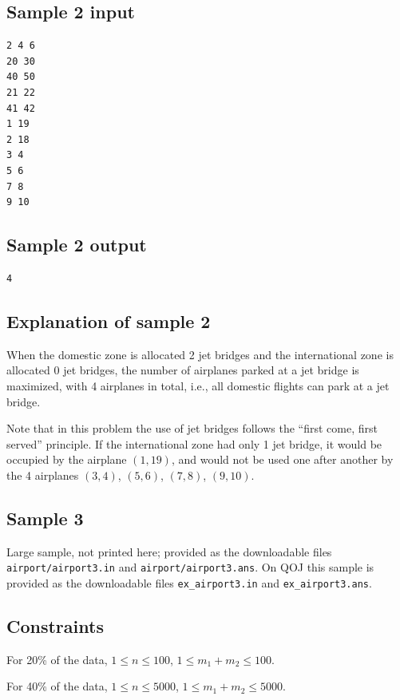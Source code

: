 \documentclass[11pt]{article}
\begin{document}
\subsection*{Sample 2 input}

\begin{verbatim}
2 4 6
20 30
40 50
21 22
41 42
1 19
2 18
3 4
5 6
7 8
9 10
\end{verbatim}

\subsection*{Sample 2 output}

\begin{verbatim}
4
\end{verbatim}

\subsection*{Explanation of sample 2}

When the domestic zone is allocated 2 jet bridges and the international
zone is allocated 0 jet bridges, the number of airplanes parked at a jet
bridge is maximized, with 4 airplanes in total, i.e., all domestic flights
can park at a jet bridge.

Note that in this problem the use of jet bridges follows the
``first come, first served'' principle.
If the international zone had only 1 jet bridge, it would be occupied by
the airplane $(1, 19)$, and would not be used one after another by the 4
airplanes $(3, 4)$, $(5, 6)$, $(7, 8)$, $(9, 10)$.

\subsection*{Sample 3}

Large sample, not printed here;
provided as the downloadable files \texttt{airport/airport3.in} and \texttt{airport/airport3.ans}.
On QOJ this sample is provided as the downloadable files
\texttt{ex\_airport3.in} and \texttt{ex\_airport3.ans}.

\subsection*{Constraints}

For 20\% of the data, $1 \le n \le 100$, $1 \le m_1 + m_2 \le 100$.

For 40\% of the data, $1 \le n \le 5000$, $1 \le m_1 + m_2 \le 5000$.
\end{document}
